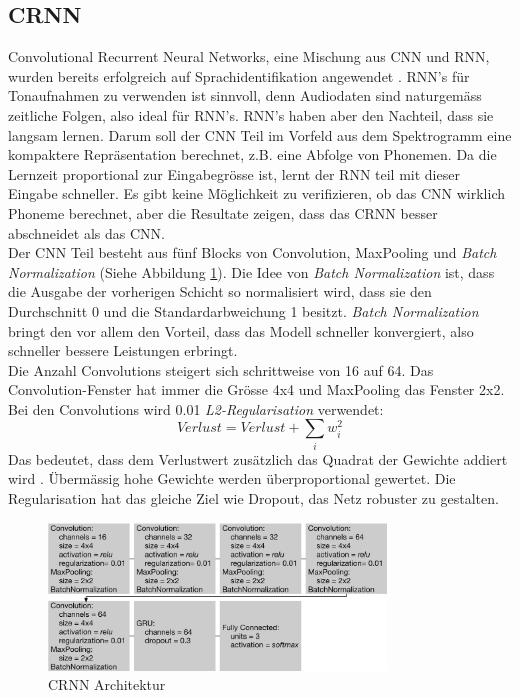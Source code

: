 \subsection{CRNN}
Convolutional Recurrent Neural Networks, eine Mischung aus CNN und RNN, wurden bereits erfolgreich auf Sprachidentifikation angewendet \parencite{crnn}\parencite{yerevann}. RNN's für Tonaufnahmen zu verwenden ist sinnvoll, denn Audiodaten sind naturgemäss zeitliche Folgen, also ideal für RNN's. RNN's haben aber den Nachteil, dass sie langsam lernen. Darum soll der CNN Teil im Vorfeld aus dem Spektrogramm eine kompaktere Repräsentation berechnet, z.B. eine Abfolge von Phonemen. Da die Lernzeit proportional zur Eingabegrösse ist, lernt der RNN teil mit dieser Eingabe schneller. Es gibt keine Möglichkeit zu verifizieren, ob das CNN wirklich Phoneme berechnet, aber die Resultate zeigen, dass das CRNN besser abschneidet als das CNN.
\\
Der CNN Teil besteht aus fünf Blocks von Convolution, MaxPooling und \textit{Batch Normalization}\label{Batch Normalization} (Siehe Abbildung \ref{img:crnn}). Die Idee von \textit{Batch Normalization} ist, dass die Ausgabe der vorherigen Schicht so normalisiert wird, dass sie den Durchschnitt 0 und die Standardarbweichung 1 besitzt. \textit{Batch Normalization} bringt den vor allem den Vorteil, dass das Modell schneller konvergiert, also schneller bessere Leistungen erbringt. \parencite{batch}
\\
Die Anzahl Convolutions steigert sich schrittweise von 16 auf 64. Das Convolution-Fenster hat immer die Grösse 4x4 und MaxPooling das Fenster 2x2. Bei den Convolutions wird 0.01 \textit{L2-Regularisation} verwendet:
$$ Verlust = Verlust + \sum_{i} w_{i}^{2}$$
Das bedeutet, dass dem Verlustwert zusätzlich das Quadrat der Gewichte addiert wird \parencite[Kap.~7.1.1]{goodfellow}. Übermässig hohe Gewichte werden überproportional gewertet. Die Regularisation hat das gleiche Ziel wie Dropout, das Netz robuster zu gestalten.
\\

 \begin{figure}[hbt]
	\centering
		\includegraphics[width=0.8\textwidth]{assets/crnn.png}
	\caption{CRNN Architektur}
	\label{img:crnn}
\end{figure}

